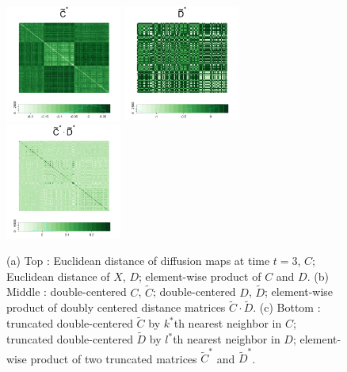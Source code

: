 \documentclass[12pt]{article}
\theoremstyle{definition}
\begin{document}
\begin{figure}[H]
	\includegraphics[width=1.5in]{../Figure/tildeCtrunc.png}
	\includegraphics[width=1.5in]{../Figure/tildeDtrunc.png}
	\includegraphics[width=1.5in]{../Figure/tildeCDtrunc.png}
	\caption{(a) Top : Euclidean distance of diffusion maps at time $t=3$, $C$; Euclidean distance of $X$, $D$; element-wise product of $C$ and $D$. (b) Middle : double-centered $C$, $\tilde{C}$; double-centered $D$, $\tilde{D}$; element-wise product of doubly centered distance matrices $\tilde{C} \cdot \tilde{D}$. (c) Bottom : truncated double-centered  $\tilde{C}$ by $k^{*}$th nearest neighbor in $C$; truncated double-centered $\tilde{D}$ by $l^{*}$th nearest neighbor in $D$; element-wise product of two truncated matrices $\tilde{C}^{*}$ and $\tilde{D}^{*}$. }
	\label{fig:MGCmatrices}
\end{figure}	
	
\end{document}
